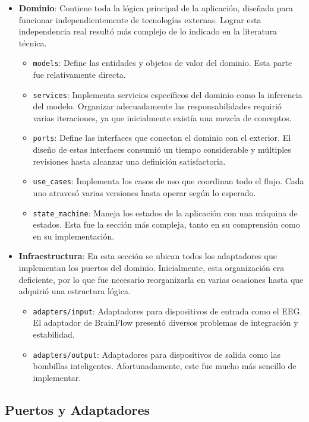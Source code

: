 \begin{itemize}
    \item \textbf{Dominio}: Contiene toda la lógica principal de la aplicación, diseñada para funcionar independientemente de tecnologías externas. Lograr esta independencia real resultó más complejo de lo indicado en la literatura técnica.
    \begin{itemize}
        \item \texttt{models}: Define las entidades y objetos de valor del dominio. Esta parte fue relativamente directa.
        \item \texttt{services}: Implementa servicios específicos del dominio como la inferencia del modelo. Organizar adecuadamente las responsabilidades requirió varias iteraciones, ya que inicialmente existía una mezcla de conceptos.
        \item \texttt{ports}: Define las interfaces que conectan el dominio con el exterior. El diseño de estas interfaces consumió un tiempo considerable y múltiples revisiones hasta alcanzar una definición satisfactoria.
        \item \texttt{use\_cases}: Implementa los casos de uso que coordinan todo el flujo. Cada uno atravesó varias versiones hasta operar según lo esperado.
        \item \texttt{state\_machine}: Maneja los estados de la aplicación con una máquina de estados. Esta fue la sección más compleja, tanto en su comprensión como en su implementación.
    \end{itemize}
    
    \item \textbf{Infraestructura}: En esta sección se ubican todos los adaptadores que implementan los puertos del dominio. Inicialmente, esta organización era deficiente, por lo que fue necesario reorganizarla en varias ocasiones hasta que adquirió una estructura lógica.
    \begin{itemize}
        \item \texttt{adapters/input}: Adaptadores para dispositivos de entrada como el EEG. El adaptador de BrainFlow presentó diversos problemas de integración y estabilidad.
        \item \texttt{adapters/output}: Adaptadores para dispositivos de salida como las bombillas inteligentes. Afortunadamente, este fue mucho más sencillo de implementar.
    \end{itemize}
\end{itemize}

\subsection{Puertos y Adaptadores}


